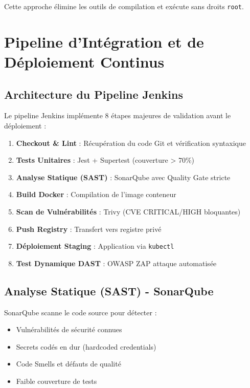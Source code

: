 \documentclass[12pt,a4paper]{article}
\begin{document}
Cette approche élimine les outils de compilation et exécute sans droits \texttt{root}.

\clearpage
\section{Pipeline d'Intégration et de Déploiement Continus}

\subsection{Architecture du Pipeline Jenkins}

Le pipeline Jenkins implémente 8 étapes majeures de validation avant le déploiement :

\begin{enumerate}
    \item \textbf{Checkout \& Lint} : Récupération du code Git et vérification syntaxique
    \item \textbf{Tests Unitaires} : Jest + Supertest (couverture > 70\%)
    \item \textbf{Analyse Statique (SAST)} : SonarQube avec Quality Gate stricte
    \item \textbf{Build Docker} : Compilation de l'image conteneur
    \item \textbf{Scan de Vulnérabilités} : Trivy (CVE CRITICAL/HIGH bloquantes)
    \item \textbf{Push Registry} : Transfert vers registre privé
    \item \textbf{Déploiement Staging} : Application via \texttt{kubectl}
    \item \textbf{Test Dynamique DAST} : OWASP ZAP attaque automatisée
\end{enumerate}

\subsection{Analyse Statique (SAST) - SonarQube}

SonarQube scanne le code source pour détecter :
\begin{itemize}
    \item Vulnérabilités de sécurité connues
    \item Secrets codés en dur (hardcoded credentials)
    \item Code Smells et défauts de qualité
    \item Faible couverture de tests
\end{itemize}
\end{document}
